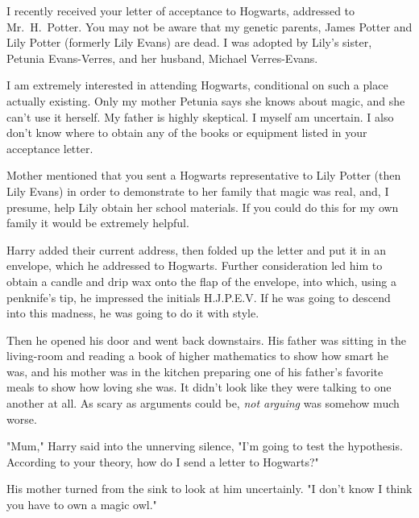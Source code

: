 \begin{writtenNote}


I recently received your letter of acceptance to Hogwarts, addressed to
Mr.~H.~Potter. You may not be aware that my genetic parents, James Potter and
Lily Potter (formerly Lily Evans) are dead. I was adopted by Lily's sister,
Petunia Evans-Verres, and her husband, Michael Verres-Evans.

I am extremely interested in attending Hogwarts, conditional on such a
place actually existing. Only my mother Petunia says she knows about magic, and
she can't use it herself. My father is highly skeptical. I myself am uncertain.
I also don't know where to obtain any of the books or equipment listed in your
acceptance letter.

Mother mentioned that you sent a Hogwarts representative to Lily Potter
(then Lily Evans) in order to demonstrate to her family that magic was real,
and, I presume, help Lily obtain her school materials. If you could do this for
my own family it would be extremely helpful.

\end{writtenNote}

Harry added their current address, then folded up the letter and put it in an
envelope, which he addressed to Hogwarts. Further consideration led him to
obtain a candle and drip wax onto the flap of the envelope, into which, using a
penknife's tip, he impressed the initials H.J.P.E.V. If he was going to descend
into this madness, he was going to do it with style.

Then he opened his door and went back downstairs. His
father was sitting in the living-room and reading a book of
higher mathematics to show how smart he was, and his mother
was in the kitchen preparing one of his father's favorite
meals to show how loving she was. It didn't look like they
were talking to one another at all. As scary as arguments
could be, \emph{not arguing} was somehow much worse.

"Mum," Harry said into the unnerving silence, "I'm going to
test the hypothesis. According to your theory, how do I
send a letter to Hogwarts?"

His mother turned from the sink to look at him uncertainly.
"I don't know{\el} I think you have to own a magic owl."

